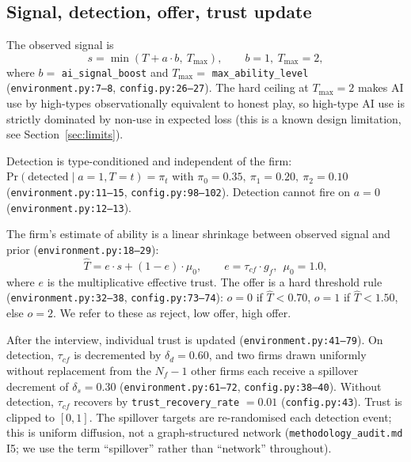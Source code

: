 \documentclass[11pt]{article}
\begin{document}
\subsection{Signal, detection, offer, trust update}

The observed signal is
\begin{equation}
  s = \min(T + a \cdot b,\ T_{\max}),
  \qquad b=1,\ T_{\max}=2,
\end{equation}
where \(b=\) \texttt{ai\_signal\_boost} and \(T_{\max}=\) \texttt{max\_ability\_level}
(\texttt{environment.py:7--8}, \texttt{config.py:26--27}). The hard ceiling at
\(T_{\max}=2\) makes AI use by high-types observationally equivalent to honest
play, so high-type AI use is strictly dominated by non-use in expected loss
(this is a known design limitation, see Section~\ref{sec:limits}).

Detection is type-conditioned and independent of the firm:
\(\mathrm{Pr}(\text{detected} \mid a=1, T=t) = \pi_{t}\) with
\(\pi_{0}=0.35,\ \pi_{1}=0.20,\ \pi_{2}=0.10\)
(\texttt{environment.py:11--15}, \texttt{config.py:98--102}).
Detection cannot fire on \(a=0\) (\texttt{environment.py:12--13}).

The firm's estimate of ability is a linear shrinkage between observed signal
and prior (\texttt{environment.py:18--29}):
\begin{equation}
  \hat{T} = e \cdot s + (1-e)\cdot \mu_{0},
  \qquad e = \tau_{cf} \cdot g_{f},\ \ \mu_{0}=1.0,
\end{equation}
where \(e\) is the multiplicative effective trust. The offer is a hard
threshold rule (\texttt{environment.py:32--38}, \texttt{config.py:73--74}):
\(o = 0\) if \(\hat{T}<0.70\), \(o = 1\) if \(\hat{T}<1.50\), else \(o = 2\).
We refer to these as reject, low offer, high offer.

After the interview, individual trust is updated
(\texttt{environment.py:41--79}). On detection, \(\tau_{cf}\) is decremented by
\(\delta_{d}=0.60\), and two firms drawn uniformly without replacement from the
\(N_{f}-1\) other firms each receive a spillover decrement of \(\delta_{s}=0.30\)
(\texttt{environment.py:61--72}, \texttt{config.py:38--40}). Without detection,
\(\tau_{cf}\) recovers by \texttt{trust\_recovery\_rate} \(=0.01\)
(\texttt{config.py:43}). Trust is clipped to \([0,1]\). The spillover targets
are re-randomised each detection event; this is uniform diffusion, not a
graph-structured network (\texttt{methodology\_audit.md} I5; we use the term
``spillover'' rather than ``network'' throughout).
\end{document}
